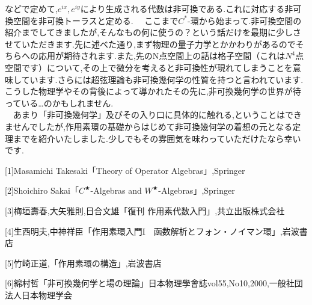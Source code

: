 などで定めて,$e^{ix},e^{iy}$により生成される代数は非可換である.これに対応する非可換空間を非可換トーラスと定める.
　ここまで$C^*$-環から始まって.非可換空間の紹介までしてきましたが,そんなもの何に使うの？という話だけを最期に少しさせていただきます.先に述べた通り,まず物理の量子力学とかかわりがあるのでそちらへの応用が期待されます.また,先のN点空間上の話は格子空間（これは$N^4$点空間です）について,その上で微分を考えると非可換性が現れてしまうことを意味しています.さらには超弦理論も非可換幾何学の性質を持つと言われています.こうした物理学やその背後によって導かれたその先に,非可換幾何学の世界が待っている…のかもしれません.\\
　あまり「非可換幾何学」及びその入り口に具体的に触れる,ということはできませんでしたが,作用素環の基礎からはじめて非可換幾何学の着想の元となる定理までを紹介いたしました.少しでもその雰囲気を味わっていただけたなら幸いです.

\begin{description}
\item{[1]}Masamichi Takesaki「Theory of Operator Algebras」,Springer
\item{[2]}Shoichiro Sakai「$C^★$-Algebras and $W^★$-Algebras」,Springer
\item{[3]}梅垣壽春,大矢雅則,日合文雄「復刊 作用素代数入門」,共立出版株式会社
\item{[4]}生西明夫,中神祥臣「作用素環入門I　函数解析とフォン・ノイマン環」,岩波書店
\item{[5]}竹崎正道,「作用素環の構造」,岩波書店
\item{[6]}綿村哲「非可換幾何学と場の理論」日本物理學會誌vol55,No10,2000,一般社団法人日本物理学会
\end{description}
